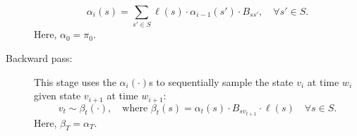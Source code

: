 \begin{algorithm}[H]
\begin{algorithmic}[1]
\begin{description}
    $$\alpha_i(s) = \sum_{s' \in S} \ell(s) \cdot \alpha_{i-1}(s')\cdot B_{ss'}, \quad \forall s' \in S. $$
    Here, $\alpha_0 = \pi_0$.
  \item[Backward pass:]
    This stage uses the $\alpha_i(\cdot)$s to sequentially sample the state $v_i$ at time $w_i$ given state $v_{i+1}$  at 
    time $w_{i+1}$:
    $$ v_t \sim \beta_t(\cdot),\quad \text{where } 
    \beta_t(s) = \alpha_t(s)\cdot B_{sv_{t+1}} \cdot \ell(s) \quad \forall s \in S.$$
    Here, $\beta_T = \alpha_T$.
\end{description}
\end{algorithmic}
\end{algorithm}

